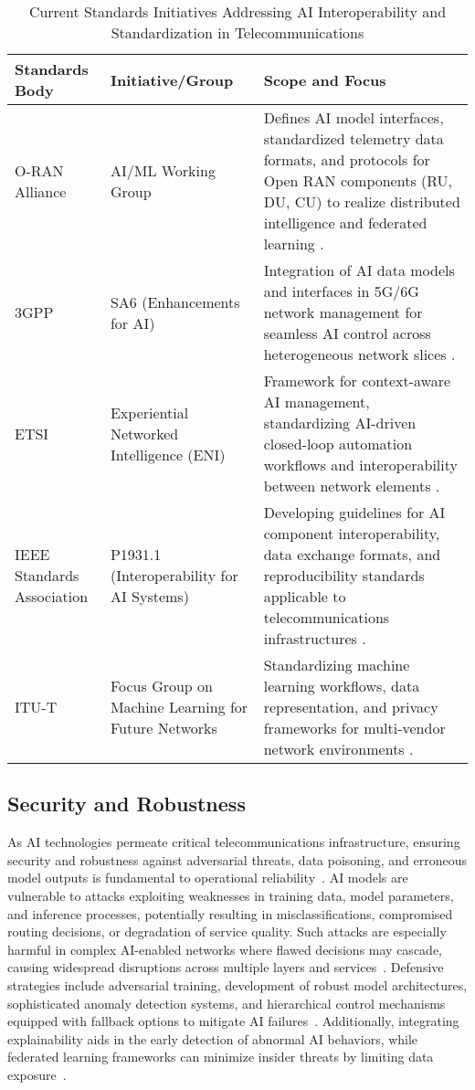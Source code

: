 \documentclass[sigconf]{acmart}
\begin{document}
\begin{table*}[htbp]
\centering
\caption{Current Standards Initiatives Addressing AI Interoperability and Standardization in Telecommunications}
\label{tab:standards_initiatives}
\begin{adjustbox}{max width=\textwidth}
\begin{tabular}{@{}lll@{}}
\toprule
\textbf{Standards Body} & \textbf{Initiative/Group} & \textbf{Scope and Focus} \\ \midrule
O-RAN Alliance & AI/ML Working Group & Defines AI model interfaces, standardized telemetry data formats, and protocols for Open RAN components (RU, DU, CU) to realize distributed intelligence and federated learning \cite{ref54}. \\
3GPP & SA6 (Enhancements for AI) & Integration of AI data models and interfaces in 5G/6G network management for seamless AI control across heterogeneous network slices \cite{ref52}. \\
ETSI & Experiential Networked Intelligence (ENI) & Framework for context-aware AI management, standardizing AI-driven closed-loop automation workflows and interoperability between network elements \cite{ref52}. \\
IEEE Standards Association & P1931.1 (Interoperability for AI Systems) & Developing guidelines for AI component interoperability, data exchange formats, and reproducibility standards applicable to telecommunications infrastructures \cite{ref48}. \\
ITU-T & Focus Group on Machine Learning for Future Networks & Standardizing machine learning workflows, data representation, and privacy frameworks for multi-vendor network environments \cite{ref54}. \\
\bottomrule
\end{tabular}
\end{adjustbox}
\end{table*}

\subsection{Security and Robustness}

As AI technologies permeate critical telecommunications infrastructure, ensuring security and robustness against adversarial threats, data poisoning, and erroneous model outputs is fundamental to operational reliability~\cite{ref48,ref50,ref55}. AI models are vulnerable to attacks exploiting weaknesses in training data, model parameters, and inference processes, potentially resulting in misclassifications, compromised routing decisions, or degradation of service quality. Such attacks are especially harmful in complex AI-enabled networks where flawed decisions may cascade, causing widespread disruptions across multiple layers and services~\cite{ref50}. Defensive strategies include adversarial training, development of robust model architectures, sophisticated anomaly detection systems, and hierarchical control mechanisms equipped with fallback options to mitigate AI failures~\cite{ref55}. Additionally, integrating explainability aids in the early detection of abnormal AI behaviors, while federated learning frameworks can minimize insider threats by limiting data exposure~\cite{ref48}.
\end{document}
